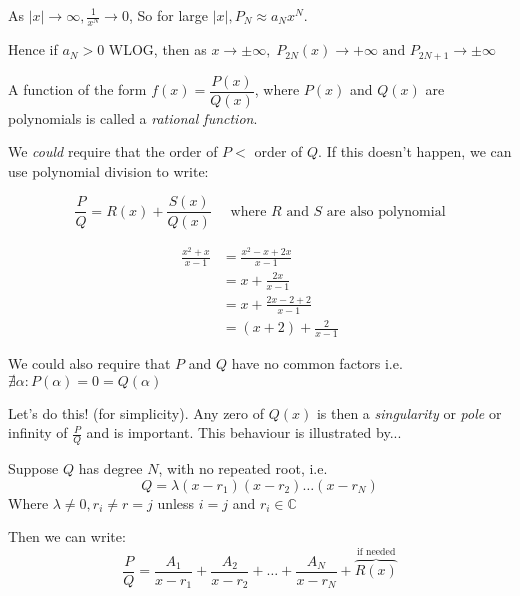 \documentclass[twoside]{scrartcl}
\begin{document}
\begin{itemize}
As $\displaystyle{ |x| \to \infty, \frac{1}{x^N} \to 0 }$, So for large $|x|, P_N \approx a_Nx^N$. 

Hence if $a_N > 0$ WLOG, then as $\displaystyle{x \to \pm \infty , \; P_{2N}(x) \to +\infty \text{ and } P_{2N+1} \to \pm \infty }$\\  
%

\end{itemize}

\vspace*{5pt}

\begin{definition}A function   of the form $f(x) = \dfrac{P(x)}{Q(x)}$, where $P(x)$ and $Q(x)$ are polynomials is called a \emph{rational function}.
\end{definition}

We \textit{could} require that the order of $P < $ order of $Q$. If this doesn't happen, we can use polynomial division to write: 

\[\frac{P}{Q} = R(x) + \frac{S(x)}{Q(x)} \quad \text{ where } R \text{ and } S \text{ are also polynomial}\]\vspace*{5pt}

\begin{example}
\[\begin{aligned}
\frac{x^2 + x}{x -1} &= \frac{x^2 - x + 2x}{x-1}\\
&= x + \frac{2x}{x-1}\\
&= x + \frac{2x-2+2}{x-1}\\
&= (x+2) + \frac{2}{x-1} \end{aligned} \]
\end{example}
We could also require that $P$ and $Q$ have no common factors i.e. $\nexists \alpha : P(\alpha) = 0 = Q(\alpha)$ 

Let's do this! (for simplicity). Any zero of $Q(x)$ is then a \emph{singularity} or \emph{pole} or infinity of $\frac{P}{Q}$ and is important. This behaviour is illustrated by...\\



Suppose $Q$ has degree $N$, with no repeated root, i.e.
\[Q = \lambda (x-r_1)(x-r_2)\dots(x-r_N)\] 
Where $\lambda \neq 0, r_i \neq r=j$ unless $i = j$ and $r_i \in \mathbb{C}$

Then we can write:
\[\frac{P}{Q} = \frac{A_1}{x-r_1} + \frac{A_2}{x-r_2} + \dots + \frac{A_N}{x-r_N} + \overbrace{R(x)}^\text{if needed} \]\vspace*{5pt}
\end{document}

